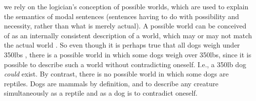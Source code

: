 \documentclass[12pt]{article}
\begin{document}
%
%
we rely on the logician's conception of possible worlds, which are used to explain the semantics of modal sentences (sentences having to do with possibility and necessity, rather than what is merely actual). 
%
A possible world can be conceived of as an internally consistent description of a world, which may or may not match the actual world \citep[][though for an opposing perspective on modal ontology see \citealp{Lewis1986}]{Adams1974}. 
%
So even though it is perhaps true that all dogs weigh under 350lbs \citep[the heaviest recorded dog weighed 343lbs;][]{Young1994}, there is a possible world in which some dogs weigh over 350lbs, since it is possible to describe such a world without contradicting oneself.
%
I.e., a 350lb dog \textit{could} exist.
%
%
By contrast, there is no possible world in which some dogs are reptiles. 
%
Dogs are mammals by definition, and to describe any creature simultaneously as a reptile and as a dog is to contradict oneself. 
%
% 
%
%
\end{document}

